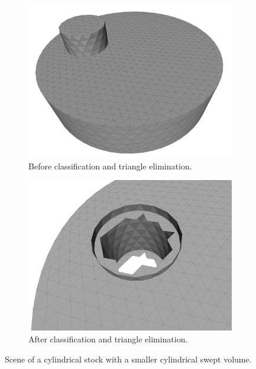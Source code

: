\begin{figure}[!h]
	\centering
	\begin{subfigure}[b]{0.4\textwidth}
		\centering
		\includegraphics[width=\textwidth]{images/cylinders_classification_before}
		\caption{
			Before classification and triangle elimination.
		}
		\label{fig:cylinders_classification_before}
	\end{subfigure}
	\begin{subfigure}[b]{0.4\textwidth}
		\centering
		\includegraphics[width=\textwidth]{images/cylinders_classification_after}
		\caption{
			After classification and triangle elimination.
		}
		\label{fig:cylinders_classification_after}
	\end{subfigure}
	\caption{
		Scene of a cylindrical stock with a smaller cylindrical swept volume.
	}
	\label{fig:cylinders_classification}
\end{figure}


